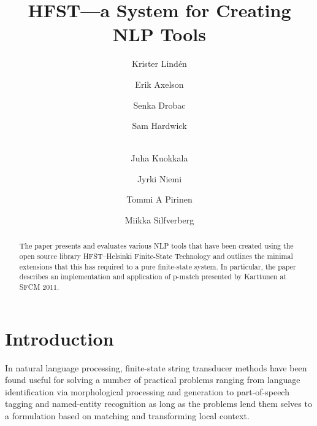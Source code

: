 \documentclass{llncs}
\begin{document}
%
\title{HFST---a System for Creating NLP Tools}
%
\author{Krister Lind\'{e}n \and Erik Axelson \and Senka Drobac \and Sam Hardwick \and\\
Juha Kuokkala \and Jyrki Niemi \and Tommi A Pirinen \and Miikka Silfverberg}

\institute{University of Helsinki\\
Department of Modern Languages\\
Unioninkatu 40 A\\
FI-00014 University of Helsinki, Finland\\
\email{\{krister.linden, erik.axelson, senka.drobac, sam.hardwick,\\
juha.kuokkala, jyrki.niemi, tommi.pirinen, miikka.silfverberg\}@helsinki.fi}}

\maketitle


\begin{abstract}
The paper presents and evaluates various NLP tools that have been created using the open source library HFST--Helsinki Finite-State Technology and outlines the minimal extensions that this has required to a pure finite-state system. In particular, the paper describes an implementation and application of p-match presented by Karttunen at SFCM 2011.
\end{abstract}

\section*{Introduction}
In natural language processing, finite-state string transducer methods have been found useful for solving a number of practical problems ranging from language identification via morphological processing and generation to part-of-speech tagging and named-entity recognition as long as the problems lend them selves to a formulation based on matching and transforming local context.
\end{document}
